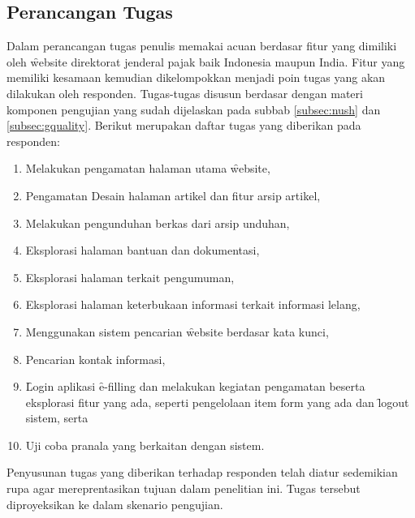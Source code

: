 \subsection{Perancangan Tugas}
Dalam perancangan tugas penulis memakai acuan berdasar fitur yang dimiliki oleh \f{website} direktorat jenderal pajak baik Indonesia maupun India. Fitur yang memiliki kesamaan kemudian dikelompokkan menjadi poin tugas yang akan dilakukan oleh responden. Tugas-tugas disusun berdasar dengan materi komponen pengujian yang sudah dijelaskan pada subbab \ref{subsec:nush} dan \ref{subsec:gquality}.
Berikut merupakan daftar tugas yang diberikan pada responden:
\begin{enumerate}
	\item Melakukan pengamatan halaman utama \f{website},
	\item Pengamatan Desain halaman artikel dan fitur arsip artikel,
	\item Melakukan pengunduhan berkas dari arsip unduhan,
	\item Eksplorasi halaman bantuan dan dokumentasi,
	\item Eksplorasi halaman terkait pengumuman,
	\item Eksplorasi halaman keterbukaan informasi terkait informasi lelang,
	\item Menggunakan sistem pencarian \f{website} berdasar kata kunci,
	\item Pencarian kontak informasi,
	\item \f{Login} aplikasi \f{e-filling} dan melakukan kegiatan pengamatan beserta eksplorasi fitur yang ada, seperti pengelolaan item form yang ada dan \f{logout} sistem, serta
	\item Uji coba pranala yang berkaitan dengan sistem.
\end{enumerate}
Penyusunan tugas yang diberikan terhadap responden telah diatur sedemikian rupa agar mereprentasikan tujuan dalam penelitian ini. Tugas tersebut diproyeksikan ke dalam skenario pengujian.
